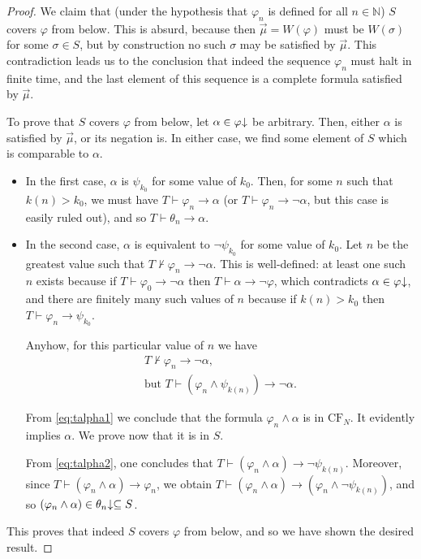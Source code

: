 \documentclass{article}
\theoremstyle{nonumberplain}
\newtheorem{proof}{Proof}
\newcommand{\N}{\mathbb{N}}
\newcommand{\CF}{\mathrm{CF}}
\newcommand{\dncl}[1]{{#1}\hspace{-0.25em}\downarrow}
\begin{document}
\begin{proof}
We claim that (under the hypothesis that $\varphi_n$ is defined for all $n \in \N$) $S$ covers $\varphi$ from below. This is absurd, because then $\vec\mu = W(\varphi)$ must be $W(\sigma)$ for some $\sigma \in S$, but by construction no such $\sigma$ may be satisfied by $\vec\mu$. This contradiction leads us to the conclusion that indeed the sequence $\varphi_n$ must halt in finite time, and the last element of this sequence is a complete formula satisfied by $\vec\mu$.

To prove that $S$ covers $\varphi$ from below, let $\alpha \in \dncl\varphi$ be arbitrary. Then, either $\alpha$ is satisfied by $\vec\mu$, or its negation is. In either case, we find some element of $S$ which is comparable to $\alpha$.
\begin{itemize}
\item In the first case, $\alpha$ is $\psi_{k_0}$ for some value of $k_0$. Then, for some $n$ such that $k(n) > k_0$, we must have $T \vdash \varphi_n \rightarrow \alpha$ (or $T \vdash \varphi_n \rightarrow \neg\alpha$, but this case is easily ruled out), and so $T \vdash \theta_n \rightarrow \alpha$.

\item In the second case, $\alpha$ is equivalent to $\neg\psi_{k_0}$ for some value of $k_0$. Let $n$ be the greatest value such that $T \nvdash \varphi_n \rightarrow \neg\alpha$. This is well-defined: at least one such $n$ exists because if $T \vdash \varphi_0 \rightarrow \neg\alpha$ then $T \vdash \alpha \rightarrow \neg\varphi$, which contradicts $\alpha \in \dncl\varphi$, and there are finitely many such values of $n$ because if $k(n) > k_0$ then $T \vdash \varphi_n \rightarrow \psi_{k_0}$.

Anyhow, for this particular value of $n$ we have
\begin{gather}
T \nvdash \varphi_n \rightarrow \neg\alpha,\label{eq:talpha1}\\
\text{but } T \vdash (\varphi_n \land \psi_{k(n)}) \rightarrow \neg\alpha. \label{eq:talpha2}
\end{gather}

From \eqref{eq:talpha1} we conclude that the formula $\varphi_n \land \alpha$ is in $\CF_N$. It evidently implies $\alpha$. We prove now that it is in $S$.

From \eqref{eq:talpha2}, one concludes that $T \vdash (\varphi_n \land \alpha) \rightarrow \neg\psi_{k(n)}$. Moreover, since $T \vdash (\varphi_n \land \alpha) \rightarrow \varphi_n$, we obtain $T \vdash (\varphi_n \land \alpha) \rightarrow (\varphi_n \land \neg\psi_{k(n)})$, and so $(\varphi_n \land \alpha) \in \dncl{\theta_n} \subseteq S$.
\end{itemize}

This proves that indeed $S$ covers $\varphi$ from below, and so we have shown the desired result.
\end{proof}
\end{document}
